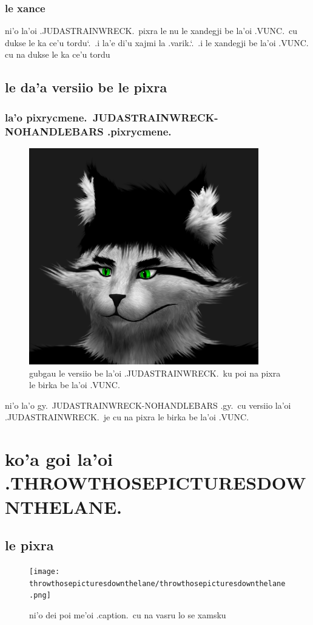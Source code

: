 \documentclass{report}
\newcommand\sds{\spacefactor\sfcode`.\ \space}
\begin{document}
\subsection{le xance}
ni'o la'oi .JUDASTRAINWRECK.\ pixra le nu le xandegji be la'oi .VUNC.\ cu dukse le ka ce'u tordu\sds  .i la'e di'u xajmi la .varik.\sds  .i le xandegji be la'oi .VUNC. cu na dukse le ka ce'u tordu

\section{le da'a versiio be le pixra}

\subsection{la'o pixrycmene.\ JUDASTRAINWRECK\hyp NOHANDLEBARS .pixrycmene.}
\begin{figure}[ht]
	\centering
	\includegraphics[width=10cm]{judastrainwreck/judastrainwreck-nohandlebars.png}
	\caption[center]{gubgau le versiio be la'oi .JUDASTRAINWRECK.\ ku poi na pixra le birka be la'oi .VUNC.}
\end{figure}
ni'o la'o gy.\ JUDASTRAINWRECK\hyp NOHANDLEBARS .gy.\ cu versiio la'oi .JUDASTRAINWRECK.\ je cu na pixra le birka be la'oi .VUNC.

\chapter{ko'a goi la'oi .THROWTHOSEPICTURESDOWNTHELANE.}
\section{le pixra}
\begin{figure}[ht]
	\centering
	\texttt{[image: throwthosepicturesdownthelane/throwthosepicturesdownthelane.png]}
	\caption[center]{ni'o dei poi me'oi .caption.\ cu na vasru lo se xamsku}
\end{figure}
\end{document}
